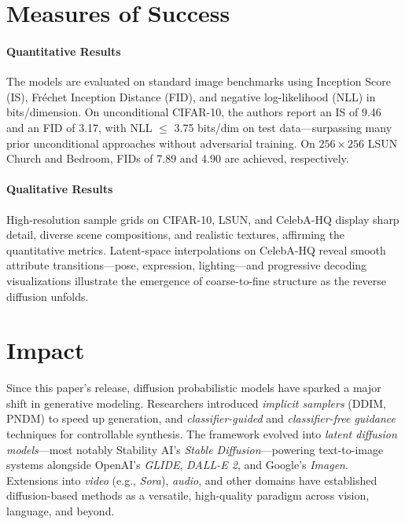 \documentclass[10pt]{article}
\begin{document}
\section*{Measures of Success}
\paragraph{Quantitative Results}
The models are evaluated on standard image benchmarks using Inception Score (IS), Fréchet Inception
Distance (FID), and negative log-likelihood (NLL) in bits/dimension. On unconditional CIFAR-10, the authors report an
IS of 9.46 and an FID of 3.17, with NLL \(\le\) 3.75 bits/dim on test data—surpassing many prior unconditional approaches
without adversarial training. On \(256\times256\) LSUN Church and Bedroom, FIDs of 7.89 and
4.90 are achieved, respectively.

\paragraph{Qualitative Results}
High-resolution sample grids on CIFAR-10, LSUN, and CelebA-HQ display sharp detail, diverse scene compositions,
and realistic textures, affirming the quantitative metrics. Latent-space interpolations on
CelebA-HQ reveal smooth attribute transitions—pose, expression, lighting—and progressive decoding visualizations
illustrate the emergence of coarse-to-fine structure as the reverse diffusion unfolds.


\section*{Impact}
Since this paper's release, diffusion probabilistic models have sparked a major shift in generative modeling. Researchers introduced \emph{implicit samplers} (DDIM\cite{DBLP:journals/corr/abs-2010-02502}, PNDM\cite{liu2022pseudonumericalmethodsdiffusion}) to speed up generation, and \emph{classifier-guided}\cite{DBLP:journals/corr/abs-2105-05233} and \emph{classifier-free guidance}\cite{DBLP:journals/corr/abs-2102-09672} techniques for controllable synthesis. The framework evolved into \emph{latent diffusion models}—most notably Stability AI's \emph{Stable Diffusion}—powering text-to-image systems alongside OpenAI's \emph{GLIDE}, \emph{DALL-E 2}, and Google's \emph{Imagen}. Extensions into \emph{video} (e.g., \emph{Sora}), \emph{audio}\cite{10112585}, and other domains have established diffusion-based methods as a versatile, high-quality paradigm across vision, language, and beyond.




\end{document}
